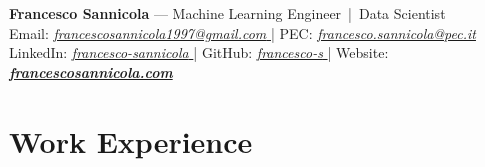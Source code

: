 \documentclass[11pt,a4paper]{article}
\let\OldHref\href
\renewcommand{\href}[2]{\OldHref{#1}{\textit{#2}}}
\begin{document}
    
    \begin{center}
        {\Large \textbf{Francesco Sannicola} — Machine Learning Engineer \,|\, Data Scientist}\\
        Email: \href{mailto:francescosannicola1997@gmail.com}{francescosannicola1997@gmail.com } |
        PEC: \href{mailto:francesco.sannicola@pec.it}{francesco.sannicola@pec.it } \\
        LinkedIn: \href{https://www.linkedin.com/in/francesco-sannicola}{francesco-sannicola } | 
        GitHub: \href{https://github.com/francesco-s}{francesco-s } | 
        Website: \href{https://francescosannicola.com}{\textbf{francescosannicola.com }}
    \end{center}
    
    \section*{Work Experience}
    
\end{document}
